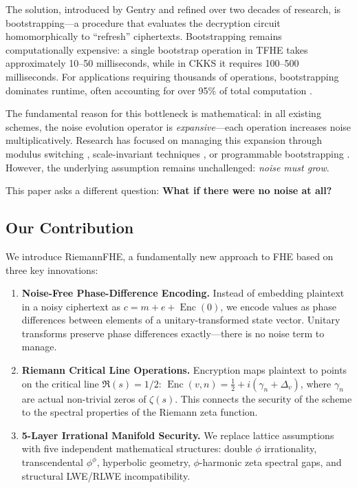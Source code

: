 \documentclass[11pt,a4paper]{article}
\theoremstyle{remark}
\DeclareMathOperator{\Enc}{Enc}
\begin{document}
The solution, introduced by Gentry and refined over two decades of research, is bootstrapping—a procedure that evaluates the decryption circuit homomorphically to ``refresh'' ciphertexts. Bootstrapping remains computationally expensive: a single bootstrap operation in TFHE takes approximately 10–50 milliseconds, while in CKKS it requires 100–500 milliseconds. For applications requiring thousands of operations, bootstrapping dominates runtime, often accounting for over 95\% of total computation \cite{chillotti2016,ducas2015}.

The fundamental reason for this bottleneck is mathematical: in all existing schemes, the noise evolution operator is \textit{expansive}—each operation increases noise multiplicatively. Research has focused on managing this expansion through modulus switching \cite{bgv2014}, scale-invariant techniques \cite{brakerski2012}, or programmable bootstrapping \cite{chillotti2016}. However, the underlying assumption remains unchallenged: \textit{noise must grow}.

This paper asks a different question: \textbf{What if there were no noise at all?}

\subsection{Our Contribution}

We introduce RiemannFHE, a fundamentally new approach to FHE based on three key innovations:

\begin{enumerate}[label=(\arabic*)]
    \item \textbf{Noise-Free Phase-Difference Encoding.} Instead of embedding plaintext in a noisy ciphertext as $c = m + e + \Enc(0)$, we encode values as phase differences between elements of a unitary-transformed state vector. Unitary transforms preserve phase differences exactly—there is no noise term to manage.
    
    \item \textbf{Riemann Critical Line Operations.} Encryption maps plaintext to points on the critical line $\Re(s) = 1/2$: $\Enc(v,n) = \frac{1}{2} + i(\gamma_n + \Delta_v)$, where $\gamma_n$ are actual non-trivial zeros of $\zeta(s)$. This connects the security of the scheme to the spectral properties of the Riemann zeta function.
    
    \item \textbf{5-Layer Irrational Manifold Security.} We replace lattice assumptions with five independent mathematical structures: double $\phi$ irrationality, transcendental $\phi^\phi$, hyperbolic geometry, $\phi$-harmonic zeta spectral gaps, and structural LWE/RLWE incompatibility.
\end{enumerate}
\end{document}
